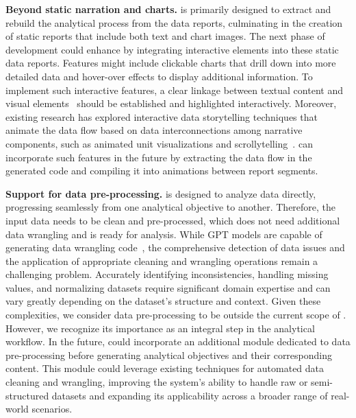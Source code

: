 \textbf{Beyond static narration and charts.}
\system{} is primarily designed to extract and rebuild the analytical process from the data reports, culminating in the creation of static reports that include both text and chart images. 
The next phase of development could enhance \system{} by integrating interactive elements into these static data reports. 
Features might include clickable charts that drill down into more detailed data and hover-over effects to display additional information. 
To implement such interactive features, a clear linkage between textual content and visual elements~\cite{chen2022crossdata, sultanum2023datatales} should be established and highlighted interactively. 
Moreover, existing research has explored interactive data storytelling techniques that animate the data flow based on data interconnections among narrative components, such as animated unit visualizations and scrollytelling~\cite{cao2023dataparticles, morth2022scrollyvis}. 
\system{} can incorporate such features in the future by extracting the data flow in the generated code and compiling it into animations between report segments. 

\textbf{Support for data pre-processing. } 
\system{} is designed to analyze data directly, progressing seamlessly from one analytical objective to another. 
Therefore, the input data needs to be clean and pre-processed, which does not need additional data wrangling and is ready for analysis. 
While GPT models are capable of generating data wrangling code~\cite{huang2023nl2rigel}, the comprehensive detection of data issues and the application of appropriate cleaning and wrangling operations remain a challenging problem. 
Accurately identifying inconsistencies, handling missing values, and normalizing datasets require significant domain expertise and can vary greatly depending on the dataset's structure and context.
Given these complexities, we consider data pre-processing to be outside the current scope of \system{}. 
However, we recognize its importance as an integral step in the analytical workflow. 
In the future, \system{} could incorporate an additional module dedicated to data pre-processing before generating analytical objectives and their corresponding content. 
This module could leverage existing techniques for automated data cleaning and wrangling, improving the system's ability to handle raw or semi-structured datasets and expanding its applicability across a broader range of real-world scenarios.

